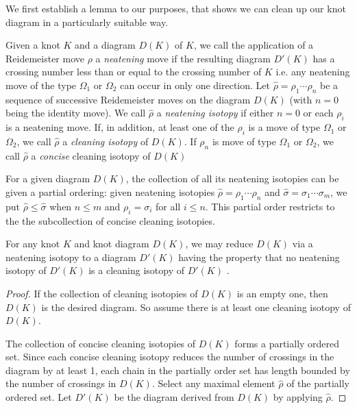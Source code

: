 We first establish a lemma to our purposes, that shows we can clean up our knot diagram in a particularly suitable way.

Given a knot $K$ and a diagram $D(K)$ of $K$, we  call the application of a 
Reidemeister move $\rho$ a {\em neatening} move if the resulting diagram $D'(K)$ has a crossing number less than or
equal to the crossing number of $K$ i.e. any neatening move
of the type $\Omega_{1}$ or $\Omega_{2}$ can occur in
only one direction. Let $\hat{\rho}=\rho_{1}\cdots\rho_{n}$ be a sequence of successive Reidemeister moves on the
diagram $D(K)$ (with $n=0$ being the identity move). We call $\hat{\rho}$ a {\em neatening isotopy} if either
$n=0$ or  each
$\rho_{i}$
is a neatening move. If, in addition, at least one of the $\rho_{i}$ is a move of  type $\Omega_{1}$ or $\Omega_{2}$, we
call $\hat{\rho}$ a {\em cleaning isotopy} of $D(K)$. If $\rho_{n}$ is  move of  type $\Omega_{1}$ or $\Omega_{2}$, we
call $\hat{\rho}$ a {\em concise}  cleaning isotopy of $D(K)$

For a given diagram $D(K)$, the collection of all its neatening isotopies can be given a partial ordering: given
neatening isotopies $\hat{\rho}=\rho_{1}\cdots\rho_{n}$ and $\hat{\sigma}=\sigma_{1}\cdots\sigma_{m}$, we put
$\hat{\rho}\le\hat{\sigma}$ when $n\le m$ and $\rho_{i}=\sigma_{i}$  for all $i\le n$. This partial order restricts to the
the subcollection  of concise cleaning isotopies.

\begin{lemma}\label{simplificationLemma} For any knot  $K$
and knot diagram $D(K)$, we may reduce
$D(K)$ via a neatening isotopy to a diagram
$D'(K)$  having the property that no neatening isotopy of $D'(K)$ is a cleaning isotopy of $D'(K)$ .
\end{lemma}
\begin{proof} If the collection of cleaning isotopies of $D(K)$ is an empty one, then $D(K)$ is the desired diagram.
So assume there is at least one cleaning isotopy of $D(K)$.

The collection of concise cleaning isotopies of
$D(K)$
forms a partially ordered set. Since each
concise cleaning
isotopy reduces the
number of crossings in the diagram by at least 1, each chain in the partially order set has length bounded by the
number of crossings in $D(K)$. Select any maximal element $\hat{\rho}$ of the partially ordered set. Let $D'(K)$ be
the diagram derived from $D(K)$ by applying $\hat{\rho}$. 
\end{proof}

